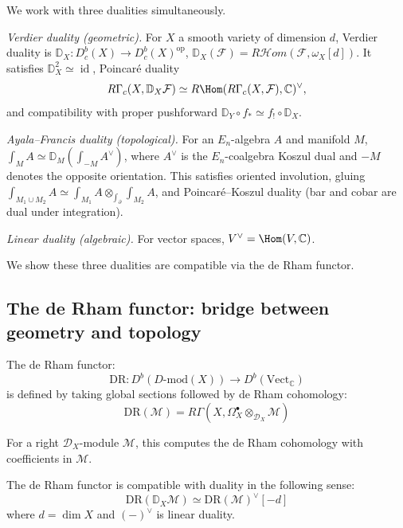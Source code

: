 \begin{definition}\label{def:three-dualities}
We work with three dualities simultaneously.

\emph{Verdier duality (geometric).}
For $X$ a smooth variety of dimension $d$, Verdier duality is
$\mathbb{D}_X\colon D^b_c(X) \to D^b_c(X)^{\mathrm{op}}$,
$\mathbb{D}_X(\mathcal{F}) = R\mathcal{H}om(\mathcal{F}, \omega_X[d])$.
It satisfies $\mathbb{D}_X^2 \simeq \operatorname{id}$, Poincar\'e duality
\[
R\Gamma_c(X, \mathbb{D}_X \mathcal{F})
\simeq R\Hom(R\Gamma_c(X, \mathcal{F}), \mathbb{C})^\vee,
\]
and compatibility with proper pushforward
$\mathbb{D}_Y \circ f_* \simeq f_! \circ \mathbb{D}_X$.

\emph{Ayala--Francis duality (topological).}
For an $E_n$-algebra $A$ and manifold $M$,
$\int_M A \simeq \mathbb{D}_M(\int_{-M} A^\vee)$,
where $A^\vee$ is the $E_n$-coalgebra Koszul dual and $-M$ denotes the opposite orientation.
This satisfies oriented involution, gluing
$\int_{M_1 \cup M_2} A \simeq \int_{M_1} A \otimes_{\int_{\partial}} \int_{M_2} A$,
and Poincar\'e--Koszul duality (bar and cobar are dual under integration).

\emph{Linear duality (algebraic).}
For vector spaces, $V^\vee = \Hom(V, \mathbb{C})$.

We show these three dualities are compatible via the de Rham functor.
\end{definition}

\subsection{The de Rham functor: bridge between geometry and topology}
\label{subsec:de-rham-functor}

\begin{definition}\label{def:de-rham-functor}
The de Rham functor:
\[\text{DR}: D^b(D\text{-mod}(X)) \to D^b(\text{Vect}_\mathbb{C})\]
is defined by taking global sections followed by de Rham cohomology:
\[\text{DR}(\mathcal{M}) = R\Gamma(X, \Omega^\bullet_X \otimes_{\mathcal{D}_X} \mathcal{M})\]

For a right $\mathcal{D}_X$-module $\mathcal{M}$, this computes
the de Rham cohomology with coefficients in $\mathcal{M}$.
\end{definition}

\begin{proposition}\label{prop:DR-preserves-duality}
The de Rham functor is compatible with duality in the following sense:
\[\text{DR}(\mathbb{D}_X \mathcal{M}) \simeq \text{DR}(\mathcal{M})^\vee[-d]\]
where $d = \dim X$ and $(-)^\vee$ is linear duality.
\end{proposition}

